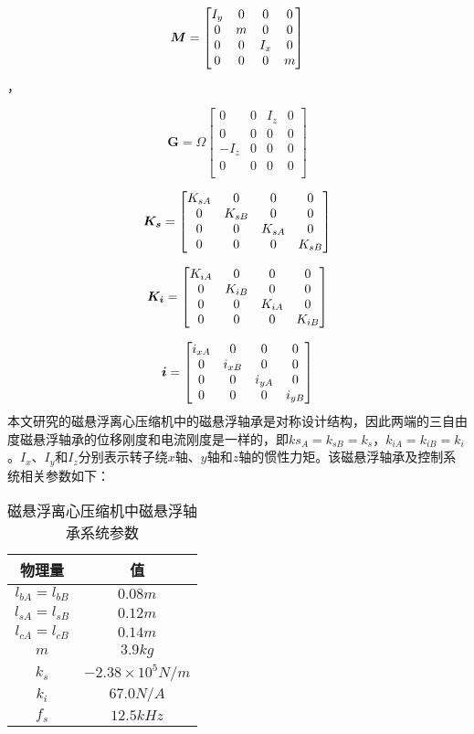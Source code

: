 \documentclass[
  lang=cn,
  degree=master,
  openany,oneside
]{nuaathesis}
\begin{document}
$$\boldsymbol{M} = \left[ {\begin{matrix}
   {{I_y}} & 0 & 0 & 0  \cr 
   0 & m & 0 & 0  \cr 
   0 & 0 & {{I_x}} & 0  \cr 
   0 & 0 & 0 & m  \cr 
 \end{matrix} } \right]$$，
 
$$\boldsymbol{G} = \Omega \left[ {\begin{matrix}
   0 & 0 & {{I_z}} & 0  	\\
   0 & 0 & 0 & 0  			\\ 
   { - {I_z}} & 0 & 0 & 0  	\\ 
   0 & 0 & 0 & 0  			\\ 
 \end{matrix} } \right]$$

$$\boldsymbol{K_s} = \left[ {\begin{matrix}
   {{K_{sA}}} & 0 & 0 & 0  \cr 
   0 & {{K_{sB}}} & 0 & 0  \cr 
   0 & 0 & {{K_{sA}}} & 0  \cr 
   0 & 0 & 0 & {{K_{sB}}}  \cr 

 \end{matrix} } \right]$$

$$\boldsymbol{K_i} = \left[ {\begin{matrix}
   {{K_{iA}}} & 0 & 0 & 0  \cr 
   0 & {{K_{iB}}} & 0 & 0  \cr 
   0 & 0 & {{K_{iA}}} & 0  \cr 
   0 & 0 & 0 & {{K_{iB}}}  \cr 

 \end{matrix} } \right]$$

$$\boldsymbol{i} = \left[ {\begin{matrix}
   {{i_{xA}}} & 0 & 0 & 0  \cr 
   0 & {{i_{xB}}} & 0 & 0  \cr 
   0 & 0 & {{i_{yA}}} & 0  \cr 
   0 & 0 & 0 & {{i_{yB}}}  \cr 

 \end{matrix} } \right]$$
本文研究的磁悬浮离心压缩机中的磁悬浮轴承是对称设计结构，因此两端的三自由度磁悬浮轴承的位移刚度和电流刚度是一样的，即$ks_A = k_{sB} = k_s$，$k_{iA} = k_{iB} = k_i$。$ I_x $、$ I_y $和$I_z$分别表示转子绕$ x $轴、$ y $轴和$ z $轴的惯性力矩。该磁悬浮轴承及控制系统相关参数如下：
\begin{table}[htb]
  \caption[磁悬浮离心压缩机中磁悬浮轴承系统参数]{磁悬浮离心压缩机中磁悬浮轴承系统参数\label{tab:bearing_para}}
  \begin{tabular}{cc}
    \toprule
    物理量 & 值 \\
    \midrule
    $l_{bA} = l_{bB}$ & $0.08m$ \\
    $l_{sA} = l_{sB}$ & $0.12m$ \\
    $l_{cA} = l_{cB}$ & $0.14m$ \\
    $m$	  & $3.9kg$ \\
    $k_s$ & $-2.38\times 10^5N/m$\\
    $k_i$ & $67.0N/A$\\
    $f_s$ & $12.5kHz$\\   
    \bottomrule
  \end{tabular}
\end{table}
\end{document}
